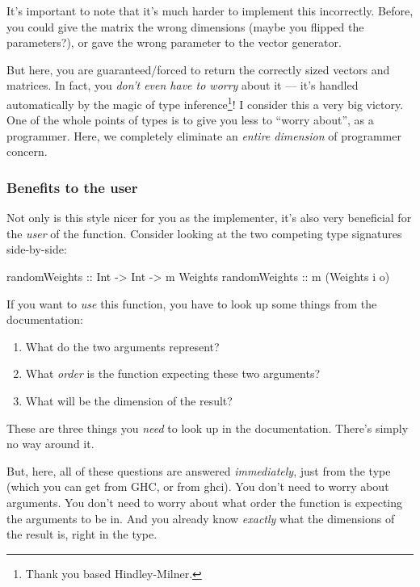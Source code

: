 \documentclass[]{article}
\newenvironment{Shaded}{}{}
\newcommand{\DataTypeTok}[1]{\textcolor[rgb]{0.56,0.13,0.00}{#1}}
\newcommand{\NormalTok}[1]{#1}
\newcommand{\OtherTok}[1]{\textcolor[rgb]{0.00,0.44,0.13}{#1}}
\begin{document}
It's important to note that it's much harder to implement this incorrectly.
Before, you could give the matrix the wrong dimensions (maybe you flipped the
parameters?), or gave the wrong parameter to the vector generator.

But here, you are guaranteed/forced to return the correctly sized vectors and
matrices. In fact, you \emph{don't even have to worry} about it --- it's handled
automatically by the magic of type inference\footnote{Thank you based
  Hindley-Milner.}! I consider this a very big victory. One of the whole points
of types is to give you less to ``worry about'', as a programmer. Here, we
completely eliminate an \emph{entire dimension} of programmer concern.

\hypertarget{benefits-to-the-user}{%
\subsubsection{Benefits to the user}\label{benefits-to-the-user}}

Not only is this style nicer for you as the implementer, it's also very
beneficial for the \emph{user} of the function. Consider looking at the two
competing type signatures side-by-side:

\begin{Shaded}
\begin{Highlighting}[]
\OtherTok{randomWeights ::} \DataTypeTok{Int} \OtherTok{{-}>} \DataTypeTok{Int} \OtherTok{{-}>}\NormalTok{ m }\DataTypeTok{Weights}
\OtherTok{randomWeights ::}\NormalTok{               m (}\DataTypeTok{Weights}\NormalTok{ i o)}
\end{Highlighting}
\end{Shaded}

If you want to \emph{use} this function, you have to look up some things from
the documentation:

\begin{enumerate}
\def\labelenumi{\arabic{enumi}.}
\tightlist
\item
  What do the two arguments represent?
\item
  What \emph{order} is the function expecting these two arguments?
\item
  What will be the dimension of the result?
\end{enumerate}

These are three things you \emph{need} to look up in the documentation. There's
simply no way around it.

But, here, all of these questions are answered \emph{immediately}, just from the
type (which you can get from GHC, or from ghci). You don't need to worry about
arguments. You don't need to worry about what order the function is expecting
the arguments to be in. And you already know \emph{exactly} what the dimensions
of the result is, right in the type.
\end{document}
